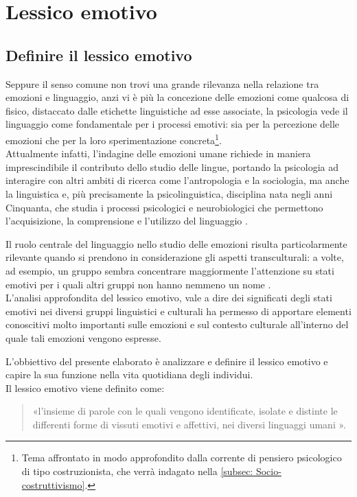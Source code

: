 \chapter{Lessico emotivo} 
\label{chap: Lessico emotivo}

\section{Definire il lessico emotivo}
Seppure il senso comune non trovi una grande rilevanza nella relazione tra emozioni e linguaggio, anzi vi è più la concezione delle emozioni come qualcosa di fisico, distaccato dalle etichette linguistiche ad esse associate, la psicologia vede il linguaggio come fondamentale per i processi emotivi: sia per la percezione delle emozioni che per la loro sperimentazione concreta\footnote{Tema affrontato in modo approfondito dalla corrente di pensiero psicologico di tipo costruzionista, che verrà indagato nella \autoref{subsec: Socio-costruttivismo}.}.\\
Attualmente infatti, l'indagine delle emozioni umane richiede in maniera imprescindibile il contributo dello studio delle lingue, portando la psicologia ad interagire con altri ambiti di ricerca come l'antropologia e la sociologia, ma anche la linguistica e, più precisamente la psicolinguistica, disciplina nata negli anni Cinquanta, che studia i processi psicologici e neurobiologici che permettono l'acquisizione, la comprensione e l'utilizzo del linguaggio \parencite{psicolinguistica}. 

Il ruolo centrale del linguaggio nello studio delle emozioni risulta particolarmente rilevante quando si prendono in considerazione gli aspetti transculturali: a volte, ad esempio, un gruppo sembra concentrare maggiormente l'attenzione su stati emotivi per i quali altri gruppi non hanno nemmeno un nome \parencite{Wierzbicka}.\\
L'analisi approfondita del lessico emotivo, vale a dire dei significati degli stati emotivi nei diversi gruppi linguistici e culturali ha permesso di apportare elementi conoscitivi molto importanti sulle emozioni e sul contesto culturale all'interno del quale tali emozioni vengono espresse.

L'obbiettivo del presente elaborato è analizzare e definire il lessico emotivo e capire la sua funzione nella vita quotidiana degli individui.\\
Il lessico emotivo viene definito come: 

\begin{quote}
    «l'insieme di parole con le quali vengono identificate, isolate e distinte le differenti forme di vissuti emotivi e affettivi, nei diversi linguaggi umani \parencite{development_of_emotioinal_competencde}».
\end{quote}

